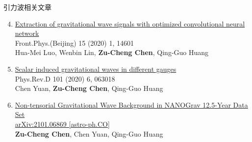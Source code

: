 \documentclass[xcolor={svgnames},compress]{beamer}
\let\olditem\item
\renewcommand{\item}{%
    \olditem\vspace{\fill}}
\begin{document}
\begin{frame}{引力波相关文章}
    \begin{enumerate}   
        \setcounter{enumi}{3} 
        \item \href{https://link.springer.com/article/10.1007\%2Fs11467-019-0936-x}{Extraction of gravitational wave signals with optimized convolutional neural network}\\
        Front.Phys.(Beijing) 15 (2020) 1, 14601\\
        Hua-Mei Luo, Wenbin Lin, \textbf{Zu-Cheng Chen}, Qing-Guo Huang  
        
        \item \href{https://journals.aps.org/prd/abstract/10.1103/PhysRevD.101.063018}{Scalar induced gravitational waves in different gauges}\\
        Phys.Rev.D 101 (2020) 6, 063018\\
        Chen Yuan, \textbf{Zu-Cheng Chen}, Qing-Guo Huang
        
        \item \href{https://arxiv.org/abs/2101.06869}{Non-tensorial Gravitational Wave Background in NANOGrav 12.5-Year Data Set}\\ \href{https://arxiv.org/abs/2101.06869}{arXiv:2101.06869 [astro-ph.CO]}\\
        \textbf{Zu-Cheng Chen}, Chen Yuan, Qing-Guo Huang
    \end{enumerate} 
\end{frame}
\end{document}
